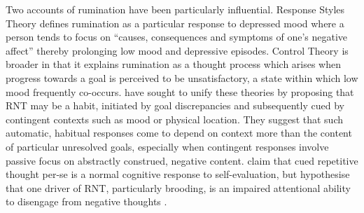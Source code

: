 \documentclass[man,floatsintext,a4paper,biblatex]{apa6}
\begin{document}
Two accounts of rumination have been particularly influential. Response
Styles Theory \parencite{nolen-hoeksema_responses_1991} defines rumination
as a particular response to depressed mood where a person tends to
focus on ``causes, consequences and symptoms of one's negative affect''
\parencite[][p. 117]{smith_roadmap_2009}
 thereby prolonging low mood and depressive episodes.  Control Theory
 \parencite{martin_ruminative_1996} is broader in that it explains
rumination as a thought process which arises when progress towards a
goal is perceived to be unsatisfactory, a state within which low mood
frequently co-occurs. \textcite{watkins_habit-goal_2014} have sought to
unify these theories by proposing that RNT may be a habit, initiated
by goal discrepancies and subsequently cued by contingent contexts
such as mood or physical location.  They suggest that such automatic,
habitual responses come to depend on context more than the content
of particular unresolved goals, especially when contingent responses
involve passive focus on abstractly construed, negative content.
\textcite{koster_understanding_2011} claim that cued repetitive
thought per-se is a normal cognitive response to self-evaluation,
but hypothesise that one driver of RNT, particularly brooding, is
an impaired attentional ability to disengage from negative thoughts
\textcite{koster_understanding_2011}.
\end{document}
